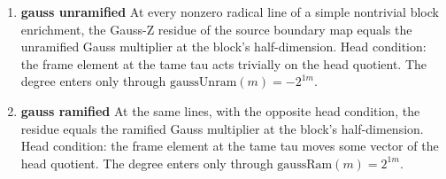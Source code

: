 \begin{enumerate}
\item[(1)] \textbf{gauss unramified} At every nonzero radical line of a simple nontrivial block enrichment, the Gauss-Z residue of the source boundary map equals the unramified Gauss multiplier at the block's half-dimension. Head condition: the frame element at the tame tau acts trivially on the head quotient. The degree enters only through $\mathrm{gaussUnram}(m)=-2^{1m}$.
\item[(2)] \textbf{gauss ramified} At the same lines, with the opposite head condition, the residue equals the ramified Gauss multiplier at the block's half-dimension. Head condition: the frame element at the tame tau moves some vector of the head quotient. The degree enters only through $\mathrm{gaussRam}(m)=2^{1m}$.
\end{enumerate}
